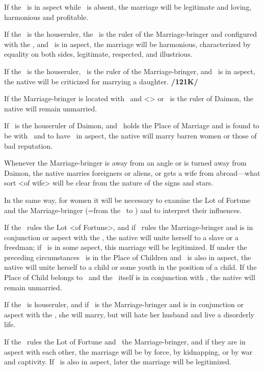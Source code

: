 If the \Sun\, is in aspect while \Saturn\, is absent, the marriage will be legitimate and loving, harmonious and profitable. 

If the \Sun\, is the houseruler, the \Moon\, is the ruler of the Marriage-bringer and configured with the \Sun, and \Jupiter\, is in aspect, the marriage will be harmonious, characterized by equality on both sides, legitimate, respected, and illustrious. 

If the \Sun\, is the houseruler, \Venus\, is the ruler of the Marriage-bringer, and \Saturn\, is in aspect, the native will be criticized for marrying a daughter. \textbf{/121K/} 

If the Marriage-bringer is located with \Saturn\, and <\Saturn> or \Mars\, is the ruler of Daimon, the native will remain unmarried. 

If \Saturn\, is the houseruler of Daimon, and \Venus\, holds the Place of Marriage and is found to be with \Mercury\, and to have \Mars\, in aspect, the native will marry barren women or those of bad reputation. 

Whenever the Marriage-bringer is away from an angle or is turned away from Daimon, the native marries foreigners or aliens, or gets a wife from abroad—what sort <of wife> will be clear from the nature of the signs and stars.

In the same way, for women it will be necessary to examine the Lot of Fortune and the Marriage-bringer (=from the \Moon\, to \Mars) and to interpret their influences. 

If the \Moon\, rules the Lot <of Fortune>, and if \Mercury\, rules the Marriage-bringer and is in conjunction or aspect with the \Moon, the native will unite herself to a slave or a freedman; if \Jupiter\, is in some aspect, this marriage will be legitimized. If under the preceding circumstances \Jupiter\, is in the Place of Children and \Saturn\, is also in aspect, the native will unite herself to a child or some youth in the position of a child. If the Place of Child belongs to \Saturn\, and the \Moon\, itself is in conjunction with \Saturn, the native will remain unmarried. 

If the \Moon\, is houseruler, and if \Saturn\, is the Marriage-bringer and is in conjunction or aspect with the \Moon, she will marry, but will hate her husband and live a disorderly life. 

If the \Moon\, rules the Lot of Fortune and \Mars\, the Marriage-bringer, and if they are in aspect with each other, the marriage will be by force, by kidnapping, or by war and captivity. If \Jupiter\, is also in aspect, later the marriage will be legitimized. 

